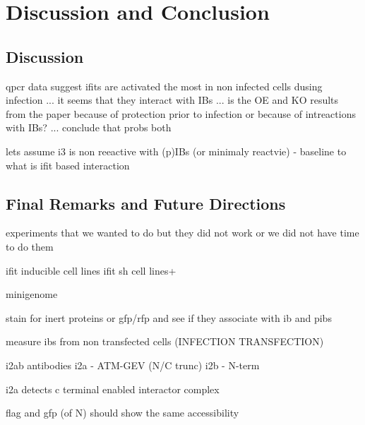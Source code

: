 \chapter{Discussion and Conclusion}
\section{Discussion}

qpcr data suggest ifits are activated the most in non infected cells dusing infection ... it seems that they interact with IBs ... is the OE and KO results from the paper because of protection prior to infection or because of intreactions with IBs? ... conclude that probs both


lets assume i3 is non reeactive with (p)IBs (or minimaly reactvie) - baseline to what is ifit based interaction

\section{Final Remarks and Future Directions}
experiments that we wanted to do but they did not work or we did not have time to do them

ifit inducible cell lines
ifit sh cell lines+

minigenome

stain for inert proteins or gfp/rfp and see if they associate with ib and pibs

measure ibs from non transfected cells (INFECTION TRANSFECTION)

i2ab antibodies
i2a - ATM-GEV (N/C trunc)
i2b - N-term

i2a detects c terminal enabled interactor complex





flag and gfp (of N) should show the same accessibility





